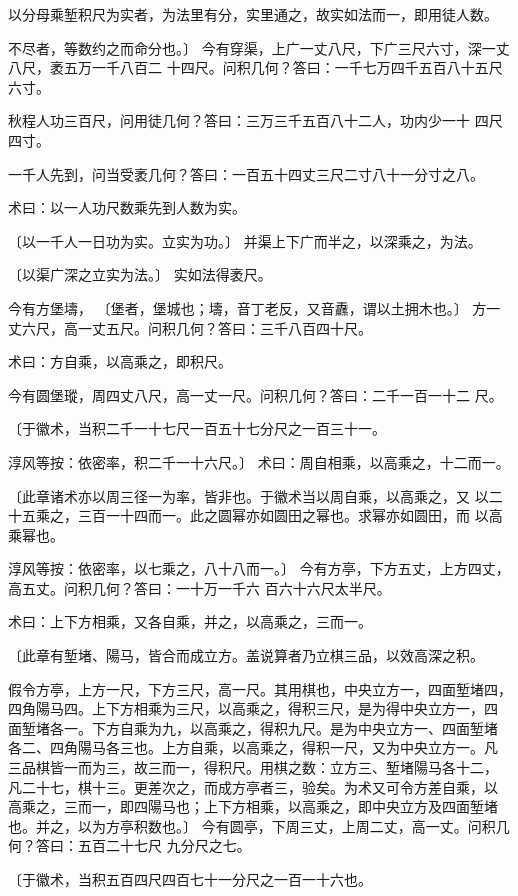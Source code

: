 \documentclass[a4paper,12pt,UTF8,twoside]{ctexbook}
\begin{document}
以分母乘堑积尺为实者，为法里有分，实里通之，故实如法而一，即用徒人数。

不尽者，等数约之而命分也。〕 今有穿渠，上广一丈八尺，下广三尺六寸，深一丈八尺，袤五万一千八百二 十四尺。问积几何？答曰：一千七万四千五百八十五尺六寸。

秋程人功三百尺，问用徒几何？答曰：三万三千五百八十二人，功内少一十 四尺四寸。

一千人先到，问当受袤几何？答曰：一百五十四丈三尺二寸八十一分寸之八。

术曰：以一人功尺数乘先到人数为实。

〔以一千人一日功为实。立实为功。〕 并渠上下广而半之，以深乘之，为法。

〔以渠广深之立实为法。〕 实如法得袤尺。

今有方堡壔， 〔堡者，堡城也；壔，音丁老反，又音纛，谓以土拥木也。〕 方一丈六尺，高一丈五尺。问积几何？答曰：三千八百四十尺。

术曰：方自乘，以高乘之，即积尺。

今有圆堡瑽，周四丈八尺，高一丈一尺。问积几何？答曰：二千一百一十二 尺。

〔于徽术，当积二千一十七尺一百五十七分尺之一百三十一。

淳风等按：依密率，积二千一十六尺。〕 术曰：周自相乘，以高乘之，十二而一。

〔此章诸术亦以周三径一为率，皆非也。于徽术当以周自乘，以高乘之，又 以二十五乘之，三百一十四而一。此之圆幂亦如圆田之幂也。求幂亦如圆田，而 以高乘幂也。

淳风等按：依密率，以七乘之，八十八而一。〕 今有方亭，下方五丈，上方四丈，高五丈。问积几何？答曰：一十万一千六 百六十六尺太半尺。

术曰：上下方相乘，又各自乘，并之，以高乘之，三而一。

〔此章有堑堵、陽马，皆合而成立方。盖说算者乃立棋三品，以效高深之积。

假令方亭，上方一尺，下方三尺，高一尺。其用棋也，中央立方一，四面堑堵四， 四角陽马四。上下方相乘为三尺，以高乘之，得积三尺，是为得中央立方一，四 面堑堵各一。下方自乘为九，以高乘之，得积九尺。是为中央立方一、四面堑堵 各二、四角陽马各三也。上方自乘，以高乘之，得积一尺，又为中央立方一。凡 三品棋皆一而为三，故三而一，得积尺。用棋之数：立方三、堑堵陽马各十二， 凡二十七，棋十三。更差次之，而成方亭者三，验矣。为术又可令方差自乘，以 高乘之，三而一，即四陽马也；上下方相乘，以高乘之，即中央立方及四面堑堵 也。并之，以为方亭积数也。〕 今有圆亭，下周三丈，上周二丈，高一丈。问积几何？答曰：五百二十七尺 九分尺之七。

〔于徽术，当积五百四尺四百七十一分尺之一百一十六也。
\end{document}
